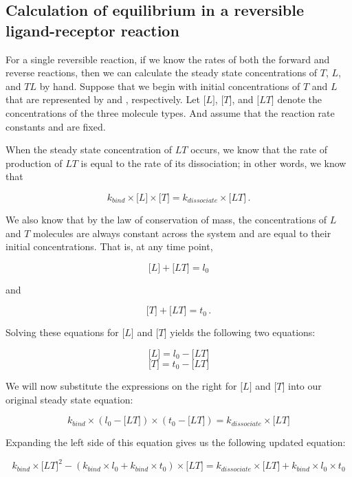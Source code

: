 \FloatBarrier
{}
\subsection{Calculation of equilibrium in a reversible ligand-receptor reaction}

For a single reversible reaction, if we know the rates of both the forward and reverse reactions, then we can calculate the steady state concentrations of $T$, $L$, and $TL$ by hand.  Suppose that we begin with initial concentrations of $T$ and $L$ that are represented by  and , respectively. Let $\text{[}L\text{]}$, $\text{[}T\text{]}$, and $\text{[}LT\text{]}$ denote the concentrations of the three molecule types. And assume that the reaction rate constants  and  are fixed.

When the steady state concentration of $LT$ occurs, we know that the rate of production of $LT$ is equal to the rate of its dissociation; in other words, we know that

$$k_{bind} \times \text{[}L\text{]} \times \text{[}T\text{]} = k_{dissociate} \times \text{[}LT\text{]} \,.$$

We also know that by the law of conservation of mass, the concentrations of $L$ and $T$ molecules are always constant across the system and are equal to their initial concentrations. That is, at any time point,

$$\text{[}L\text{]} + \text{[}LT\text{]} = l_0$$

and

$$\text{[}T\text{]} + \text{[}LT\text{]} = t_0 \,.$$

Solving these equations for $\text{[}L\text{]}$ and $\text{[}T\text{]}$ yields the following two equations:

$$\text{[}L\text{]} = l_0 - \text{[}LT\text{]}$$
$$\text{[}T\text{]} = t_0 - \text{[}LT\text{]}$$


We will now substitute the expressions on the right for $\text{[}L\text{]}$ and $\text{[}T\text{]}$ into our original steady state equation:

$$k_{bind} \times (l_0 - \text{[}LT\text{]}) \times (t_0 - \text{[}LT\text{]}) = k_{dissociate}\times \text{[}LT\text{]}$$

Expanding the left side of this equation gives us the following updated equation:

$$k_{bind} \times \text{[}LT\text{]}^2 - (k_{bind} \times l_0 + k_{bind} \times t_0) \times \text{[}LT\text{]}  = k_{dissociate} \times \text{[}LT\text{]} + k_{bind} \times l_0 \times t_0$$

